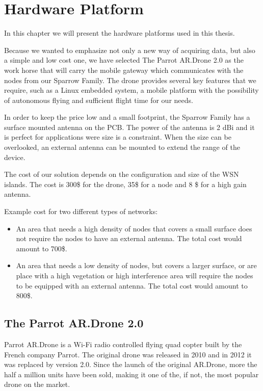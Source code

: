 \normalfont\normalsize
\chapter{Hardware Platform}

In this chapter we will present the hardware platforms used in this thesis. 

Because we wanted to emphasize not only a new way of acquiring data, but also a simple and low cost one, we have selected The Parrot AR.Drone 2.0 as the work horse that will carry the mobile gateway which communicates with the nodes from our Sparrow Family. The drone provides several key features that we require, such as a Linux embedded system, a mobile platform with the possibility of autonomous flying and sufficient flight time for our needs.

In order to keep the price low and a small footprint, the Sparrow Family has a surface mounted antenna on the PCB. The power of the antenna is 2 dBi and it is perfect for applications were size is a constraint. When the size can be overlooked, an external antenna can be mounted to extend the range of the device.

The cost of our solution depends on the configuration and size of the WSN islands. The cost is 300\$ for the drone, 35\$ for a node and 8 \$ for a high gain antenna. 

Example cost for two different types of networks:
\begin{itemize}

\item An area that needs a high density of nodes that covers a small surface does not require the nodes to have an external antenna. The total cost would amount to 700\$.

\item  An area that needs a low density of nodes, but covers a larger surface, or are place with a high vegetation or high interference area will require the nodes to be equipped with an external antenna. The total cost would amount to 800\$.

\end{itemize}

\section{The Parrot AR.Drone 2.0}\cite{parrot2012drone}

Parrot AR.Drone is a Wi-Fi radio controlled flying quad copter built by the French company Parrot.
The original drone was released in 2010 and in 2012 it was replaced by version 2.0. Since the launch of the original AR.Drone, more the half a million units have been sold, making it one of the, if not, the most popular drone on the market.\cite{parrotpopular}

